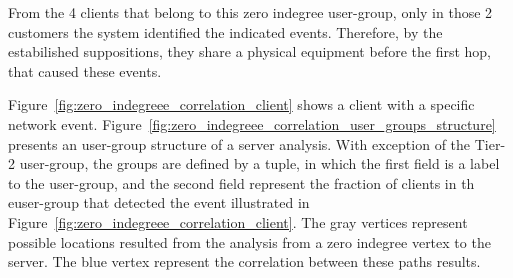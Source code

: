 From the 4 clients that belong to this zero indegree user-group, only in those 2
customers the system identified the indicated events.
Therefore, by the estabilished suppositions, they
share a physical equipment before the first hop, that caused these events.

Figure~\ref{fig:zero_indegreee_correlation_client} shows a client with a
specific network event.
Figure~\ref{fig:zero_indegreee_correlation_user_groups_structure} presents an
user-group structure of a server analysis. With exception of the Tier-2
user-group, the groups are defined by a tuple, in which the first field is a
label to the user-group, and the second field represent the fraction of clients
in th euser-group that detected the event illustrated in
Figure~\ref{fig:zero_indegreee_correlation_client}. The gray vertices represent
possible locations resulted from the analysis from a zero indegree vertex to
the server. The blue vertex represent the correlation between these paths
results.

